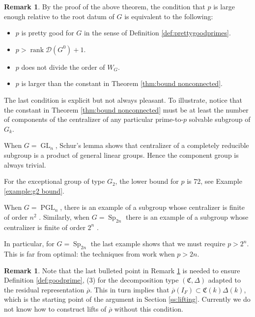 \documentclass[11pt, letterpaper,english]{amsart}
\theoremstyle{plain}
\theoremstyle{definition}
\newtheorem{remark}[lem]{Remark}
\numberwithin{equation}{section}
\numberwithin{lem}{section}
\newcommand{\fC}{\mathfrak{C}}
\newcommand{\sD}{{\mathscr D}}
\DeclareMathOperator{\rank}{rank}
\newcommand{\rhobar}{{\overline{\rho}}}
\DeclareMathOperator{\GL}{GL}
\DeclareMathOperator{\PGL}{PGL}
\DeclareMathOperator{\Sp}{Sp}
\newcommand{\Dt}{\Delta}
\begin{document}
\begin{remark} \label{rmk:bound for G}
By the proof of the above theorem, the condition that $p$ is large enough relative to the root datum of $G$ is equivalent to the following: 
\begin{itemize}
    \item $p$ is pretty good for $G$ in the sense of Definition \ref{def:prettygoodprimes}.
    \item $p>\rank \sD(G^0) +1$.
    \item $p$ does not divide the order of $W_G$.
    \item $p$ is larger than the constant in Theorem \ref{thm:bound nonconnected}. 
\end{itemize}

The last condition is explicit but not always pleasant.  To illustrate, notice that the constant in Theorem \ref{thm:bound nonconnected} must be at least the number of components of the centralizer of any particular prime-to-$p$ solvable subgroup of $G_k$.  

 When $G = \GL_n$, Schur's lemma shows that centralizer of a completely reducible subgroup is a product of general linear groups.  Hence the component group is always trivial.

 For the exceptional group of type $G_2$, the lower bound for $p$ is 72, see Example \ref{example:g2 bound}.

 When $G = \PGL_n$, there is an example of a subgroup whose centralizer is finite of order $n^2$ \cite[Examples(3)]{liebeck}.  Similarly, when $G = \Sp_{2n}$ there is an example of a subgroup whose centralizer is finite of order $2^n$ \cite[Examples(2)]{liebeck}.

In particular, for $G = \Sp_{2n}$ the last example shows that we must require $p>2^n$.  This is far from optimal: the techniques from \cite{Booher19} work when $p>2n$.
\end{remark}

\begin{remark}
Note that the last bulleted point in Remark \ref{rmk:bound for G} is needed to ensure Definition \ref{def:goodprime}, (3) for the decomposition type $(\fC, \Dt)$ adapted to the residual representation $\rhobar$. This in turn implies that $\rhobar(I_F) \subset \fC(k) \Dt(k)$, which is the starting point of the argument in Section \ref{ss:lifting}. Currently we do not know how to construct lifts of $\rhobar$ without this condition. 
\end{remark}
\end{document}
